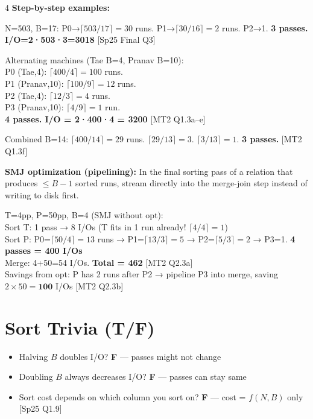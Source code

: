 \documentclass[8pt,letterpaper]{article}
\newcommand{\key}[1]{\textbf{\color{red!70!black}#1}}
\newcommand{\ans}[1]{\textbf{\color{blue!80!black}#1}}
\newcommand{\qref}[1]{{\fontsize{3.5}{4}\selectfont\color{purple!60!black}[#1]}}
\begin{document}
\begin{multicols*}{4}
\key{Step-by-step examples:}
\begin{ansbox}
N=503, B=17: P0→$\lceil503/17\rceil=30$ runs. P1→$\lceil30/16\rceil=2$ runs. P2→1. \textbf{3 passes. I/O=2·503·3=3018} \qref{Sp25 Final Q3}
\end{ansbox}

\begin{ansbox}
Alternating machines (Tae B=4, Pranav B=10):\\
P0 (Tae,4): $\lceil400/4\rceil=100$ runs.\\
P1 (Pranav,10): $\lceil100/9\rceil=12$ runs.\\
P2 (Tae,4): $\lceil12/3\rceil=4$ runs.\\
P3 (Pranav,10): $\lceil4/9\rceil=1$ run.\\
\textbf{4 passes. I/O = 2·400·4 = 3200} \qref{MT2 Q1.3a–e}
\end{ansbox}

\begin{ansbox}
Combined B=14: $\lceil400/14\rceil=29$ runs. $\lceil29/13\rceil=3$. $\lceil3/13\rceil=1$. \textbf{3 passes.} \qref{MT2 Q1.3f}
\end{ansbox}

\key{SMJ optimization (pipelining):} In the final sorting pass of a relation that produces $\le B-1$ sorted runs, stream directly into the merge-join step instead of writing to disk first.
\begin{ansbox}
T=4pp, P=50pp, B=4 (SMJ without opt):\\
Sort T: 1 pass → 8 I/Os (T fits in 1 run already! $\lceil4/4\rceil=1$)\\
Sort P: P0=$\lceil50/4\rceil=13$ runs → P1=$\lceil13/3\rceil=5$ → P2=$\lceil5/3\rceil=2$ → P3=1. \textbf{4 passes = 400 I/Os}\\
Merge: 4+50=54 I/Os. \textbf{Total = 462} \qref{MT2 Q2.3a}\\
Savings from opt: P has 2 runs after P2 → pipeline P3 into merge, saving $2\times50=\mathbf{100}$ I/Os \qref{MT2 Q2.3b}
\end{ansbox}

\section{Sort Trivia (T/F)}
\begin{itemize}
  \item Halving $B$ doubles I/O? \ans{F} — passes might not change
  \item Doubling $B$ always decreases I/O? \ans{F} — passes can stay same
  \item Sort cost depends on which column you sort on? \ans{F} — cost = $f(N,B)$ only \qref{Sp25 Q1.9}
\end{itemize}


\end{multicols*}
\end{document}
